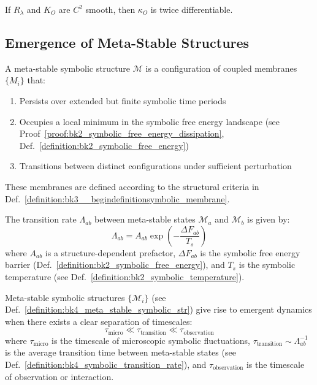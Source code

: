 \begin{theorem}[Differentiability]
\label{theorem:bk4_curvature_differentiability}
If $R_\lambda$ and $K_O$ are $C^2$ smooth, then $\kappa_O$ is twice differentiable.
\end{theorem}

\subsection{Emergence of Meta-Stable Structures} \label{subsec:bk4_emergence_meta_stable_structures}
\begin{definition} \label{definition:bk4_meta_stable_symbolic_str}
A meta-stable symbolic structure $\mathcal{M}$ is a configuration of coupled membranes $\{M_i\}$ that:
\begin{enumerate}
    \item Persists over extended but finite symbolic time periods
    \item Occupies a local minimum in the symbolic free energy landscape (see Proof~\ref{proof:bk2_symbolic_free_energy_dissipation}, Def.~\ref{definition:bk2_symbolic_free_energy})
    \item Transitions between distinct configurations under sufficient perturbation
\end{enumerate}
These membranes are defined according to the structural criteria in Def.~\ref{definition:bk3__begindefinitionsymbolic_membrane}.
\end{definition}
\begin{definition} \label{definition:bk4_symbolic_transition_rate}
The transition rate $\Lambda_{ab}$ between meta-stable states $\mathcal{M}_a$ and $\mathcal{M}_b$ is given by:
\begin{equation}
    \Lambda_{ab} = A_{ab} \exp\left(-\frac{\Delta F_{ab}}{T_s}\right)
\end{equation}
where $A_{ab}$ is a structure-dependent prefactor, $\Delta F_{ab}$ is the symbolic free energy barrier (Def.~\ref{definition:bk2_symbolic_free_energy}), and $T_s$ is the symbolic temperature (see Def.~\ref{definition:bk2_symbolic_temperature}).
\end{definition}
\begin{theorem} \label{thm:bk4_emergence_through_timescale_separation}
Meta-stable symbolic structures $\{\mathcal{M}_i\}$ (see Def.~\ref{definition:bk4_meta_stable_symbolic_str}) give rise to emergent dynamics when there exists a clear separation of timescales:
\begin{equation}
    \tau_{\text{micro}} \ll \tau_{\text{transition}} \ll \tau_{\text{observation}}
\end{equation}
where $\tau_{\text{micro}}$ is the timescale of microscopic symbolic fluctuations, $\tau_{\text{transition}} \sim \Lambda_{ab}^{-1}$ is the average transition time between meta-stable states (see Def.~\ref{definition:bk4_symbolic_transition_rate}), and $\tau_{\text{observation}}$ is the timescale of observation or interaction.
\end{theorem}
